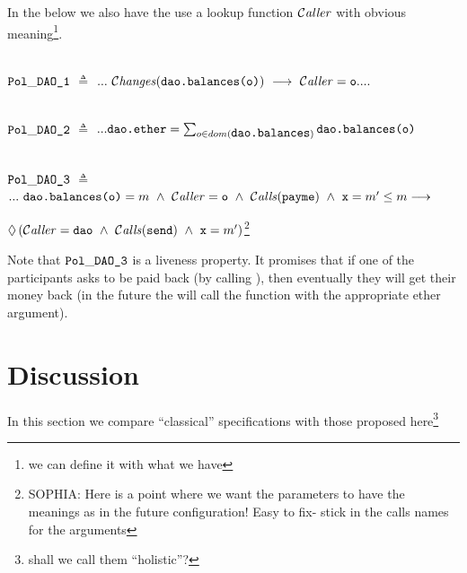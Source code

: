 In the below we also have the use a lookup function ${\mathcal{C}}\textrm{\textit{aller}}$ with obvious meaning\footnote{we can define it with what we have}.

~ \\
\noindent
${{\mbox{\tt{Pol}}}\_{{\mbox{\tt{DAO\_1}}}}}$ $\triangleq$ $ ...\ \Changes{\prg{dao.balances(o)}}\  \longrightarrow\   \Caller=\prg{o} ....$

~ \\
\noindent
${{\mbox{\tt{Pol}}}\_{{\mbox{\tt{DAO\_2}}}}}$ $\triangleq$ $ ... {\mbox{\tt{dao.ether}}}=\sum_{o\in dom({\mbox{\tt{dao.balances}}})}  {\mbox{\tt{dao.balances(o)}}}$

~ \\
\noindent
${{\mbox{\tt{Pol}}}\_{{\mbox{\tt{DAO\_3}}}}}$ $\triangleq$ $... \ \prg{dao.balances(o)}=m \ \wedge\ \Caller = \prg{o}\ \wedge\ \Calls{payme} \ \wedge\ \prg{x}=m'\leq m  \longrightarrow  $\\
\strut \hspace{5cm}
$\Future{(\Caller=\prg{dao}\ \wedge\ \Calls{send} \ \wedge\  \prg{x}=m')}$\footnote{SOPHIA: Here is a point where we
want the parameters to have the meanings as in the future configuration! Easy to fix- stick in the calls names for the arguments}

Note that ${{\mbox{\tt{Pol}}}\_{{\mbox{\tt{DAO\_3}}}}}$ is a liveness property. It promises that if one of the  participants asks to be paid back
(by calling ), then eventually they will get their money back (in the future the  will call the function 
with the appropriate ether argument).


\section{Discussion}
In this section we compare ``classical'' specifications with those proposed here\footnote{shall we call them ``holistic''?}

